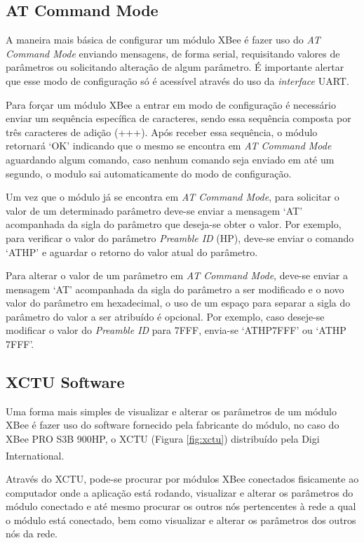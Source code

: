 \subsection{AT Command Mode}

A maneira mais básica de configurar um módulo XBee é fazer uso do \emph{AT Command Mode} enviando mensagens, de forma serial, requisitando valores de parâmetros ou solicitando alteração de algum parâmetro. É importante alertar que esse modo de configuração só é acessível através do uso da \emph{interface} UART.

Para forçar um módulo XBee a entrar em modo de configuração é necessário enviar um sequência específica de caracteres, sendo essa sequência composta por três caracteres de adição (+++). Após receber essa sequência, o módulo retornará `OK' indicando que o mesmo se encontra em \emph{AT Command Mode} aguardando algum comando, caso nenhum comando seja enviado em até um segundo, o modulo sai automaticamente do modo de configuração.

Um vez que o módulo já se encontra em \emph{AT Command Mode}, para solicitar o valor de um determinado parâmetro deve-se enviar a mensagem `AT' acompanhada da sigla do parâmetro que deseja-se obter o valor. Por exemplo, para verificar o valor do parâmetro \emph{Preamble ID} (HP), deve-se enviar o comando `ATHP' e aguardar o retorno do valor atual do parâmetro.

Para alterar o valor de um parâmetro em \emph{AT Command Mode}, deve-se enviar a mensagem `AT' acompanhada da sigla do parâmetro a ser modificado e o novo valor do parâmetro em hexadecimal, o uso de um espaço para separar a sigla do parâmetro do valor a ser atribuído é opcional. Por exemplo, caso deseje-se modificar o valor do \emph{Preamble ID} para 7FFF, envia-se `ATHP7FFF' ou `ATHP 7FFF'.

\subsection{XCTU Software}

Uma forma mais simples de visualizar e alterar os parâmetros de um módulo XBee é fazer uso do software fornecido pela fabricante do módulo, no caso do XBee PRO S3B 900HP, o XCTU (Figura \ref{fig:xctu}) distribuído pela Digi International\textsuperscript{\texttrademark}.

Através do XCTU, pode-se procurar por módulos XBee conectados fisicamente ao computador onde a aplicação está rodando, visualizar e alterar os parâmetros do módulo conectado e até mesmo procurar os outros nós pertencentes à rede a qual o módulo está conectado, bem como visualizar e alterar os parâmetros dos outros nós da rede. 

